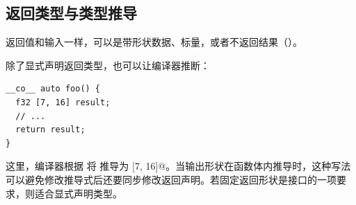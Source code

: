 \subsection*{返回类型与类型推导}

返回值和输入一样，可以是带形状数据、标量，或者不返回结果（\co@void@）。

除了显式声明返回类型，也可以让编译器推断：

\begin{lstlisting}[language=croqtile,caption={返回类型与类型推导}]
__co__ auto foo() {
  f32 [7, 16] result;
  // ...
  return result;
}
\end{lstlisting}

这里，编译器根据 \co@result@ 将 \co@auto@ 推导为  [7, 16]@。当输出形状在函数体内推导时，这种写法可以避免修改推导式后还要同步修改返回声明。若固定返回形状是接口的一项要求，则适合显式声明类型。
